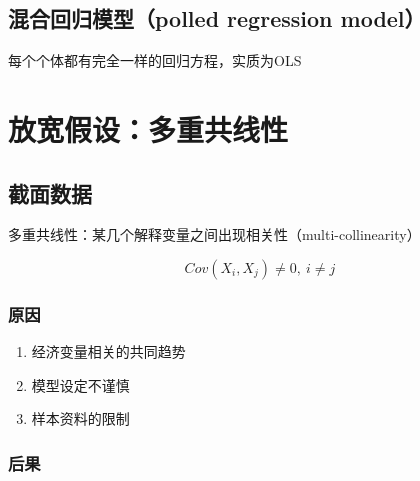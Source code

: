 \documentclass[12pt]{book}
\begin{document}
\subsection{混合回归模型（polled regression model）}
每个个体都有完全一样的回归方程，实质为OLS




\section{放宽假设：多重共线性}



\subsection{截面数据}




多重共线性：某几个解释变量之间出现相关性（multi-collinearity）

$$
Cov\left(X_i,X_j\right)\neq0,\ i\neq j 
$$

\subsubsection{原因}

\begin{enumerate}[1.]
    \item 经济变量相关的共同趋势  
    \item 模型设定不谨慎  
    \item 样本资料的限制
\end{enumerate}


\subsubsection{后果}
\end{document}
